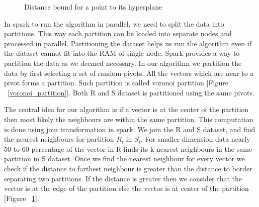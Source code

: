 \begin{center}
\begin{figure}
\caption{ Distance bound for a point to its hyperplane }
\label{fig_triangle_inequality}
\end{figure}
\end{center}


In spark to run the algorithm in parallel, we need to split the data
into partitions. This way each partition can be loaded into separate
nodes and processed in parallel. Partitioning the dataset helps us run
the algorithm even if the dataset cannot fit into the RAM of single
node. Spark provides a way to partition the data as we deemed necessary.
In our algorithm we partition the data by first selecting a set of
random pivots. All the vectors which are near to a pivot forms a
partition. Such partition is called voronoi partition [Figure ~\ref{voronoi_partition}]. Both R and S
dataset is partitioned using the same pivots.

The central
idea for our algorithm is if a vector is at the center of the partition
then most likely the neighbours are within the same partition. This
computation is done using join transformation in spark. We join
the R and S dataset, and find the nearest neighbours for partition
$R_i$ in $S_i$. For smaller dimension data nearly 50 to 60 percentage
of the vector in R finds its k nearest neighbours in the same
partition in S dataset. Once we find the nearest neighbour for every
vector we check if the distance to farthest neighbour is greater than
the distance to border separating two partitions. If the distance is
greater then we consider that the vector is at the edge of the
partition else the vector is at center of the partition [Figure ~\ref{fig_triangle_inequality}].

